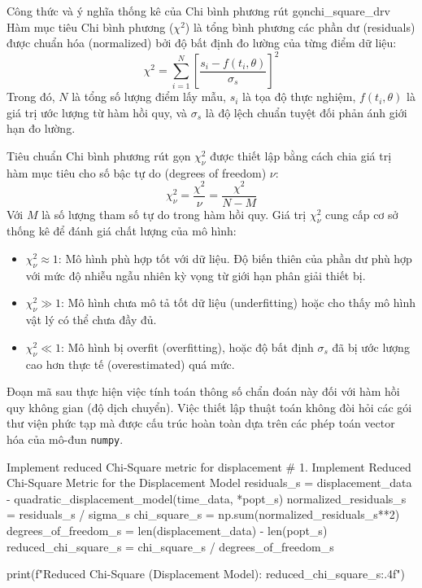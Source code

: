 \begin{derivation}{Công thức và ý nghĩa thống kê của Chi bình phương rút gọn}{chi_square_drv}
Hàm mục tiêu Chi bình phương ($\chi^2$) là tổng bình phương các phần dư (residuals) được chuẩn hóa (normalized) bởi độ bất định đo lường của từng điểm dữ liệu:
\begin{equation}
    \chi^2 = \sum_{i=1}^{N} \left[ \frac{s_i - f(t_i, \theta)}{\sigma_s} \right]^2
    \label{eq:chi_square}
\end{equation}
Trong đó, $N$ là tổng số lượng điểm lấy mẫu, $s_i$ là tọa độ thực nghiệm, $f(t_i, \theta)$ là giá trị ước lượng từ hàm hồi quy, và $\sigma_s$ là độ lệch chuẩn tuyệt đối phản ánh giới hạn đo lường.

Tiêu chuẩn Chi bình phương rút gọn $\chi^2_\nu$ được thiết lập bằng cách chia giá trị hàm mục tiêu cho số bậc tự do (degrees of freedom) $\nu$:
\begin{equation}
    \chi^2_\nu = \frac{\chi^2}{\nu} = \frac{\chi^2}{N - M}
    \label{eq:reduced_chi_square}
\end{equation}
Với $M$ là số lượng tham số tự do trong hàm hồi quy. Giá trị $\chi^2_\nu$ cung cấp cơ sở thống kê để đánh giá chất lượng của mô hình:
\begin{itemize}
    \item $\chi^2_\nu \approx 1$: Mô hình phù hợp tốt với dữ liệu. Độ biến thiên của phần dư phù hợp với mức độ nhiễu ngẫu nhiên kỳ vọng từ giới hạn phân giải thiết bị.
    \item $\chi^2_\nu \gg 1$: Mô hình chưa mô tả tốt dữ liệu (underfitting) hoặc cho thấy mô hình vật lý có thể chưa đầy đủ.
    \item $\chi^2_\nu \ll 1$: Mô hình bị overfit (overfitting), hoặc độ bất định $\sigma_s$ đã bị ước lượng cao hơn thực tế (overestimated) quá mức.
\end{itemize}
\end{derivation}

Đoạn mã sau thực hiện việc tính toán thông số chẩn đoán này đối với hàm hồi quy không gian (độ dịch chuyển). Việc thiết lập thuật toán không đòi hỏi các gói thư viện phức tạp mà được cấu trúc hoàn toàn dựa trên các phép toán vector hóa của mô-đun \texttt{numpy}.

\begin{pycode}{Implement reduced Chi-Square metric for displacement}
# 1. Implement Reduced Chi-Square Metric for the Displacement Model
residuals_s = displacement_data - quadratic_displacement_model(time_data, *popt_s)
normalized_residuals_s = residuals_s / sigma_s
chi_square_s = np.sum(normalized_residuals_s**2)
degrees_of_freedom_s = len(displacement_data) - len(popt_s)
reduced_chi_square_s = chi_square_s / degrees_of_freedom_s

print(f"Reduced Chi-Square (Displacement Model): {reduced_chi_square_s:.4f}")
\end{pycode}

